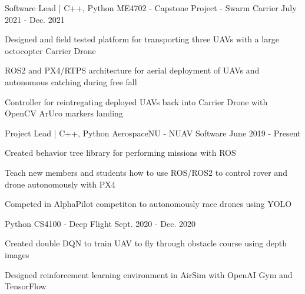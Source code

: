 
\begin{cventries}
  \cventry
    {Software Lead | C++, Python} %
    {ME4702 - Capstone Project - Swarm Carrier} %
    {} %
    {July 2021 - Dec. 2021} %
    {
      \begin{cvitems} %
        \item {Designed and field tested platform for transporting three UAVs with a large octocopter Carrier Drone}
        \item {ROS2 and PX4/RTPS architecture for aerial deployment of UAVs and autonomous catching during free fall}
        \item {Controller for reintregating deployed UAVs back into Carrier Drone with OpenCV ArUco markers landing}
      \end{cvitems}
    }

  \cventry
    {Project Lead | C++, Python} %
    {AerospaceNU - NUAV Software} %
    {} %
    {June 2019 - Present} %
    {
      \begin{cvitems} %
        \item {Created behavior tree library for performing missions with ROS}
        \item {Teach new members and students how to use ROS/ROS2 to control rover and drone autonomously with PX4}
        \item {Competed in AlphaPilot competiton to autonomously race drones using YOLO}
      \end{cvitems}
    }

  \cventry
    {Python} %
    {CS4100 - Deep Flight} %
    {} %
    {Sept. 2020 - Dec. 2020} %
    {
      \begin{cvitems} %
        \item {Created double DQN to train UAV to fly through obstacle course using depth images}
        \item {Designed reinforcement learning environment in AirSim with OpenAI Gym and TensorFlow}
      \end{cvitems}
    }


\end{cventries}
